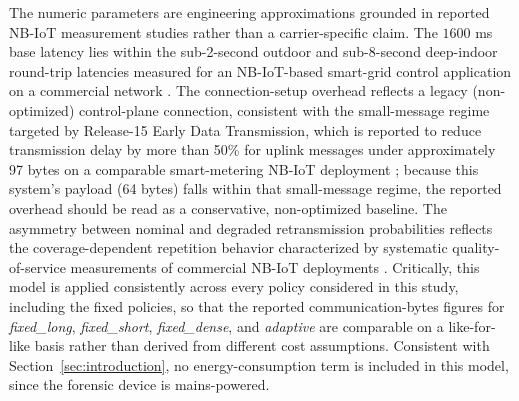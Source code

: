 \documentclass{ieeeaccess}
\begin{document}
The numeric parameters are engineering approximations grounded in reported NB-IoT measurement studies rather than a carrier-specific claim. The $1600$ ms base latency lies within the sub-2-second outdoor and sub-8-second deep-indoor round-trip latencies measured for an NB-IoT-based smart-grid control application on a commercial network \cite{b32}. The connection-setup overhead reflects a legacy (non-optimized) control-plane connection, consistent with the small-message regime targeted by Release-15 Early Data Transmission, which is reported to reduce transmission delay by more than 50\% for uplink messages under approximately 97 bytes on a comparable smart-metering NB-IoT deployment \cite{b33}; because this system's payload (64 bytes) falls within that small-message regime, the reported overhead should be read as a conservative, non-optimized baseline. The asymmetry between nominal and degraded retransmission probabilities reflects the coverage-dependent repetition behavior characterized by systematic quality-of-service measurements of commercial NB-IoT deployments \cite{b34}. Critically, this model is applied consistently across every policy considered in this study, including the fixed policies, so that the reported communication-bytes figures for \textit{fixed\_long}, \textit{fixed\_short}, \textit{fixed\_dense}, and \textit{adaptive} are comparable on a like-for-like basis rather than derived from different cost assumptions. Consistent with Section~\ref{sec:introduction}, no energy-consumption term is included in this model, since the forensic device is mains-powered.
\end{document}
